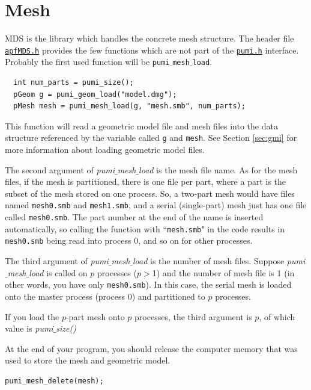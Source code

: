 \documentclass{article}
\begin{document}
\section{Mesh}
\label{sec:mds}

MDS is the library which handles the concrete mesh structure.
The header file
\href{https://github.com/SCOREC/core/blob/master/mds/apfMDS.h}{\texttt{apfMDS.h}}
provides the few functions which are not part of the
\href{https://github.com/SCOREC/core/blob/master/pumi/pumi.h}{\texttt{pumi.h}}
interface.
Probably the first used function will be \texttt{pumi$\_$mesh$\_$load}.

\begin{lstlisting}
  int num_parts = pumi_size();
  pGeom g = pumi_geom_load("model.dmg");
  pMesh mesh = pumi_mesh_load(g, "mesh.smb", num_parts);
\end{lstlisting}

This function will read a geometric model file and mesh files into
the data structure referenced by the variable called \texttt{g} and \texttt{mesh}.
See Section \ref{sec:gmi} for more information about loading
geometric model files. 

The second argument of \emph{pumi$\_$mesh$\_$load} is the mesh file name.
As for the mesh files, if the mesh is partitioned, there is one file per part, where a
part is the subset of the mesh stored on one process.
So, a two-part mesh would have files named \texttt{mesh0.smb}
and \texttt{mesh1.smb}, and a serial (single-part) mesh just has one file
called \texttt{mesh0.smb}.
The part number at the end of the name is inserted automatically,
so calling the function with ``\texttt{mesh.smb}" in the code
results in \texttt{mesh0.smb} being read into process 0, and so
on for other processes.

The third argument of \emph{pumi$\_$mesh$\_$load} is the number of mesh files.
Suppose \emph{pumi$\_$mesh$\_$load} is called on $p$ processes ($p$$>$1) and the number of mesh file is $1$ (in other words, you have only \texttt{mesh0.smb}). In this case, the serial mesh is loaded onto the master process (process $0$) and partitioned to $p$ processes. 

If you load the $p$-part mesh onto $p$ processes, the third argument is $p$, of which value is \emph{pumi$\_$size()}

At the end of your program, you should release the computer
memory that was used to store the mesh and geometric model.

\begin{lstlisting}
pumi_mesh_delete(mesh);
\end{lstlisting}
\end{document}

